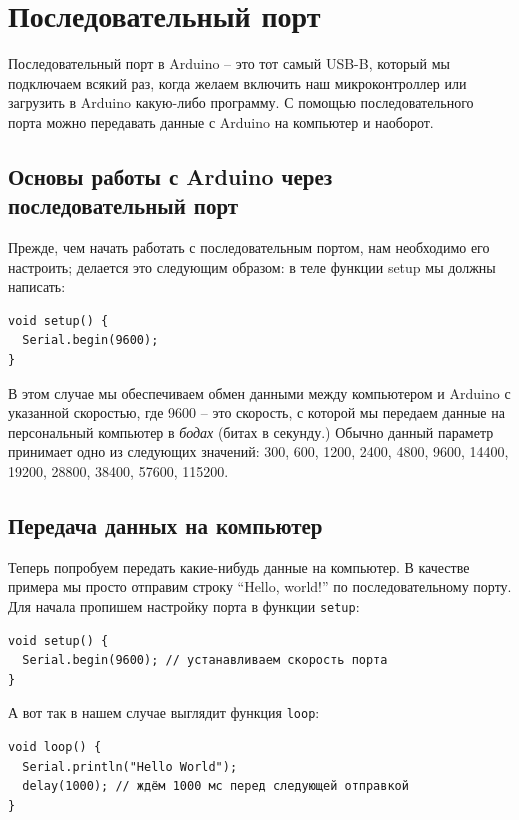 \documentclass[a4paper,twoside]{book}
\begin{document}
\section{Последовательный порт}

Последовательный порт в Arduino -- это тот самый USB-B, который мы подключаем
всякий раз, когда желаем включить наш микроконтроллер или загрузить в Arduino
какую-либо программу.  С помощью последовательного порта можно передавать данные
с Arduino на компьютер и наоборот.

\subsection{Основы работы с Arduino через последовательный порт}

Прежде, чем начать работать с последовательным портом, нам необходимо его
настроить; делается это следующим образом: в теле функции setup мы должны
написать:

\begin{verbatim}
void setup() {
  Serial.begin(9600);
}
\end{verbatim}

В этом случае мы обеспечиваем обмен данными между компьютером и Arduino с
указанной скоростью, где 9600 -- это скорость, с которой мы передаем данные на
персональный компьютер в \emph{бодах} (битах в секунду.) Обычно данный параметр
принимает одно из следующих значений: 300, 600, 1200, 2400, 4800, 9600, 14400,
19200, 28800, 38400, 57600, 115200.

\subsection{Передача данных на компьютер}

Теперь попробуем передать какие-нибудь данные на компьютер. В качестве примера
мы просто отправим строку ``Hello, world!'' по последовательному порту. Для
начала пропишем настройку порта в функции \texttt{setup}:

\begin{verbatim}
void setup() {
  Serial.begin(9600); // устанавливаем скорость порта
}
\end{verbatim}

А вот так в нашем случае выглядит функция \texttt{loop}:

\begin{verbatim}
void loop() {
  Serial.println("Hello World");
  delay(1000); // ждём 1000 мс перед следующей отправкой
}
\end{verbatim}
\end{document}
